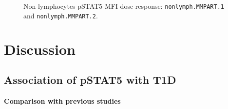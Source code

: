 \begin{figure}
\begin{minipage}{.5\textwidth}
\end{minipage}
\begin{minipage}{.3\textwidth}
{ Non-lymphocytes pSTAT5 MFI dose-response: \texttt{nonlymph.MMPART.1} and \texttt{nonlymph.MMPART.2}. }
{ }
\end{minipage}
\end{figure}

\clearpage


\section{Discussion}

\subsection{Association of pSTAT5 with T1D}

\paragraph{Comparison with previous studies}

